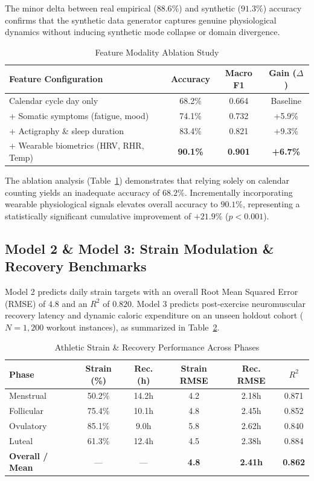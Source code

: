 \documentclass[conference]{IEEEtran}
\begin{document}
The minor delta between real empirical ($88.6\%$) and synthetic ($91.3\%$) accuracy confirms that the synthetic data generator captures genuine physiological dynamics without inducing synthetic mode collapse or domain divergence.

\begin{table}[htbp]
\caption{Feature Modality Ablation Study}
\label{tab:ablation}
\centering
\begin{tabular}{lccc}
\toprule
\textbf{Feature Configuration} & \textbf{Accuracy} & \textbf{Macro F1} & \textbf{Gain ($\Delta$)} \\
\midrule
Calendar cycle day only & 68.2\% & 0.664 & Baseline \\
+ Somatic symptoms (fatigue, mood) & 74.1\% & 0.732 & +5.9\% \\
+ Actigraphy \& sleep duration & 83.4\% & 0.821 & +9.3\% \\
+ Wearable biometrics (HRV, RHR, Temp) & \textbf{90.1\%} & \textbf{0.901} & \textbf{+6.7\%} \\
\bottomrule
\end{tabular}
\end{table}

The ablation analysis (Table~\ref{tab:ablation}) demonstrates that relying solely on calendar counting yields an inadequate accuracy of $68.2\%$. Incrementally incorporating wearable physiological signals elevates overall accuracy to $90.1\%$, representing a statistically significant cumulative improvement of $+21.9\%$ ($p < 0.001$).

\subsection{Model 2 \& Model 3: Strain Modulation \& Recovery Benchmarks}
Model 2 predicts daily strain targets with an overall Root Mean Squared Error (RMSE) of $4.8$ and an $R^2$ of $0.820$. Model 3 predicts post-exercise neuromuscular recovery latency and dynamic caloric expenditure on an unseen holdout cohort ($N = 1{,}200$ workout instances), as summarized in Table~\ref{tab:strain_recovery}.

\begin{table}[htbp]
\caption{Athletic Strain \& Recovery Performance Across Phases}
\label{tab:strain_recovery}
\centering
\begin{tabular}{lccccc}
\toprule
\textbf{Phase} & \textbf{Strain (\%)} & \textbf{Rec. (h)} & \textbf{Strain RMSE} & \textbf{Rec. RMSE} & \textbf{$R^2$} \\
\midrule
Menstrual & 50.2\% & 14.2h & 4.2 & 2.18h & 0.871 \\
Follicular & 75.4\% & 10.1h & 4.8 & 2.45h & 0.852 \\
Ovulatory & 85.1\% & 9.0h & 5.8 & 2.62h & 0.840 \\
Luteal & 61.3\% & 12.4h & 4.5 & 2.38h & 0.884 \\
\midrule
\textbf{Overall / Mean} & --- & --- & \textbf{4.8} & \textbf{2.41h} & \textbf{0.862} \\
\bottomrule
\end{tabular}
\end{table}
\end{document}
